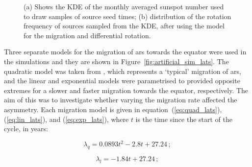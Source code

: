 \begin{figure}[ht!]
	\centering
	\qquad
	\caption{(a) Shows the KDE of the monthly averaged sunspot number used to draw samples of source seed times; (b) distribution of the rotation frequency of sources sampled from the KDE, after using the model for the migration and differential rotation.} 
	\label{fig:KDE_lats}
\end{figure}

Three separate models for the migration of \glspl{ar} towards the equator were used in the simulations and they are shown in Figure~\ref{fig:artificial_sim_lats}. The quadratic model was taken from \citet{li_latitude_2001}, which represents a `typical' migration of \glspl{ar}, and the linear and exponential models were parametrised to provided opposite extremes for a slower and faster migration towards the equator, respectively. The aim of this was to investigate whether varying the migration rate affected the asymmetry. Each migration model is given in equation~(\ref{eq:quad_lats}), (\ref{eq:lin_lats}), and (\ref{eq:exp_lats}), where $t$ is the time since the start of the cycle, in years:

\begin{equation}
\lambda_{q} = 0.0893t^2 - 2.8t + 27.24 \, ;
\label{eq:quad_lats}
\end{equation}

\begin{equation}
\lambda_{l} = -1.84t + 27.24 \, ;
\label{eq:lin_lats}
\end{equation}

